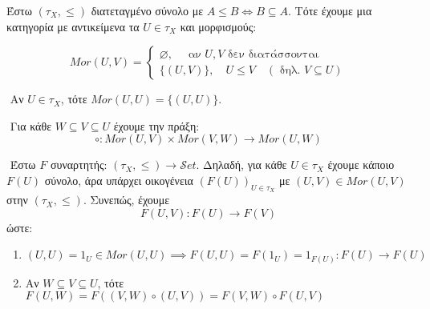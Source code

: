 \vspace{0.3truecm}

\begin{figure}[H]
    \centering
\end{figure}

Έστω $(\tau_X, \leq )$ διατεταγμένο σύνολο με $A\leq B \iff B\subseteq A$. Τότε έχουμε μια κατηγορία με αντικείμενα τα $U \in \tau_X$ και μορφισμούς:

$$Mor(U,V) = \begin{cases}
    \varnothing, \quad\text{ αν } U,V \text{ δεν διατάσσονται} \\
    \{(U,V)\}, \quad U \leq V \quad (\text{ δηλ. } V\subseteq U)
\end{cases}$$

$ $\newline
Αν $U \in \tau_X$, τότε $Mor(U,U) = \{(U,U)\}$.

$ $\newline
Για κάθε $W\subseteq V \subseteq U$ έχουμε την πράξη:
$$\circ : Mor(U,V) \times Mor(V,W) \longrightarrow Mor(U,W)$$


$ $\newline
Έστω $F$ συναρτητής: $(\tau_X , \leq) \rightarrow \mathcal{S}et$. Δηλαδή, για κάθε $U \in \tau_X$ έχουμε κάποιο $F(U)$ σύνολο, άρα υπάρχει οικογένεια $(F(U))_{U \in \tau_X}$ με $(U,V) \in Mor(U,V)$ στην $(\tau_X,\leq)$. Συνεπώς, έχουμε
$$F(U,V): F(U)\rightarrow F(V)$$ ώστε:

\begin{enumerate}
    \item $(U,U) = 1_U \in Mor(U,U) \implies F(U,U) = F(1_U) = 1_{F(U)}: F(U) \rightarrow F(U)$
    \item Αν $W\subseteq V \subseteq U$, τότε $F(U,W) = F((V,W)\circ (U,V)) = F(V,W) \circ F(U,V)$

\end{enumerate}



